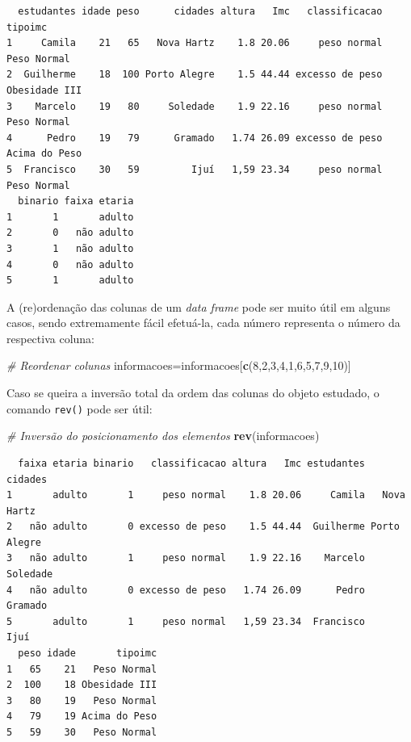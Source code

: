 \documentclass[12pt,portuguese,oneside]{book}
\newenvironment{Shaded}{\begin{snugshade}}{\end{snugshade}}
\newcommand{\KeywordTok}[1]{\textcolor[rgb]{0.13,0.29,0.53}{\textbf{#1}}}
\newcommand{\DecValTok}[1]{\textcolor[rgb]{0.00,0.00,0.81}{#1}}
\newcommand{\CommentTok}[1]{\textcolor[rgb]{0.56,0.35,0.01}{\textit{#1}}}
\newcommand{\NormalTok}[1]{#1}
\begin{document}
\begin{verbatim}
  estudantes idade peso      cidades altura   Imc   classificacao       tipoimc
1     Camila    21   65   Nova Hartz    1.8 20.06     peso normal   Peso Normal
2  Guilherme    18  100 Porto Alegre    1.5 44.44 excesso de peso Obesidade III
3    Marcelo    19   80     Soledade    1.9 22.16     peso normal   Peso Normal
4      Pedro    19   79      Gramado   1.74 26.09 excesso de peso Acima do Peso
5  Francisco    30   59         Ijuí   1,59 23.34     peso normal   Peso Normal
  binario faixa etaria
1       1       adulto
2       0   não adulto
3       1   não adulto
4       0   não adulto
5       1       adulto
\end{verbatim}

A (re)ordenação das colunas de um \emph{data frame} pode ser muito útil
em alguns casos, sendo extremamente fácil efetuá-la, cada número
representa o número da respectiva coluna:

\begin{Shaded}
\begin{Highlighting}[]
\CommentTok{# Reordenar colunas}
\NormalTok{informacoes=informacoes[}\KeywordTok{c}\NormalTok{(}\DecValTok{8}\NormalTok{,}\DecValTok{2}\NormalTok{,}\DecValTok{3}\NormalTok{,}\DecValTok{4}\NormalTok{,}\DecValTok{1}\NormalTok{,}\DecValTok{6}\NormalTok{,}\DecValTok{5}\NormalTok{,}\DecValTok{7}\NormalTok{,}\DecValTok{9}\NormalTok{,}\DecValTok{10}\NormalTok{)]}
\end{Highlighting}
\end{Shaded}

Caso se queira a inversão total da ordem das colunas do objeto estudado,
o comando \texttt{rev()} pode ser útil:

\begin{Shaded}
\begin{Highlighting}[]
\CommentTok{# Inversão do posicionamento dos elementos}
\KeywordTok{rev}\NormalTok{(informacoes)}
\end{Highlighting}
\end{Shaded}

\begin{verbatim}
  faixa etaria binario   classificacao altura   Imc estudantes      cidades
1       adulto       1     peso normal    1.8 20.06     Camila   Nova Hartz
2   não adulto       0 excesso de peso    1.5 44.44  Guilherme Porto Alegre
3   não adulto       1     peso normal    1.9 22.16    Marcelo     Soledade
4   não adulto       0 excesso de peso   1.74 26.09      Pedro      Gramado
5       adulto       1     peso normal   1,59 23.34  Francisco         Ijuí
  peso idade       tipoimc
1   65    21   Peso Normal
2  100    18 Obesidade III
3   80    19   Peso Normal
4   79    19 Acima do Peso
5   59    30   Peso Normal
\end{verbatim}
\end{document}
